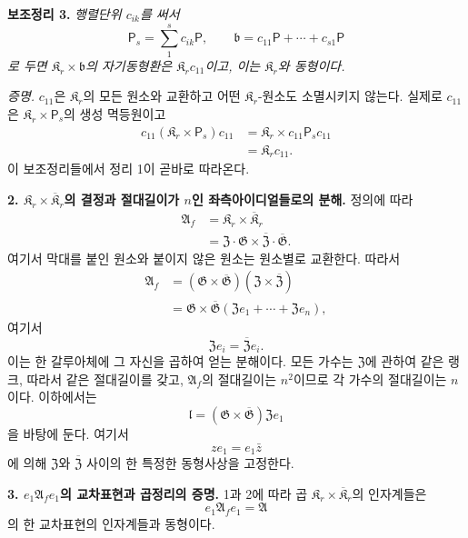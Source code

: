 \noindent\textbf{보조정리 3.} \emph{행렬단위 \(c_{ik}\)를 써서}
\[
        \mathsf P_s=\sum_1^s c_{ik}\mathsf P,
        \qquad
        \mathfrak b=c_{11}\mathsf P+
        \cdots+c_{s1}\mathsf P
\]
\emph{로 두면 \(\mathfrak K_r\times\mathfrak b\)의 자기동형환은 \(\mathfrak K_rc_{11}\)이고, 이는 \(\mathfrak K_r\)와 동형이다.}

\noindent\emph{증명.} \(c_{11}\)은 \(\mathfrak K_r\)의 모든 원소와 교환하고 어떤 \(\mathfrak K_r\)-원소도 소멸시키지 않는다. 실제로 \(c_{11}\)은 \(\mathfrak K_r\times\mathsf P_s\)의 생성 멱등원이고
\[
\begin{aligned}
c_{11}(\mathfrak K_r\times\mathsf P_s)c_{11}
 &=\mathfrak K_r\times c_{11}\mathsf P_sc_{11}\\
 &=\mathfrak K_rc_{11}.
\end{aligned}
\]
이 보조정리들에서 정리 1이 곧바로 따라온다.

\noindent\textbf{2. \(\mathfrak K_r\times\overline{\mathfrak K}_r\)의 결정과 절대길이가 \(n\)인 좌측아이디얼들로의 분해.} 정의에 따라
\[
\begin{aligned}
\mathfrak A_f
 &=\mathfrak K_r\times\overline{\mathfrak K}_r\\
 &=\mathfrak Z\mathbin{\cdot}\mathfrak G
   \times
   \overline{\mathfrak Z}\mathbin{\cdot}\overline{\mathfrak G}.
\end{aligned}
\]
여기서 막대를 붙인 원소와 붙이지 않은 원소는 원소별로 교환한다. 따라서
\[
\begin{aligned}
\mathfrak A_f
 &=(\mathfrak G\times\overline{\mathfrak G})
   (\mathfrak Z\times\overline{\mathfrak Z})\\
 &=\mathfrak G\times\overline{\mathfrak G}
   (\mathfrak Ze_1+\cdots+\mathfrak Ze_n),
\end{aligned}
\]
여기서
\[
        \mathfrak Ze_i=\overline{\mathfrak Z}e_i.
\]
이는 한 갈루아체에 그 자신을 곱하여 얻는 분해이다. 모든 가수는 \(\mathfrak Z\)에 관하여 같은 랭크, 따라서 같은 절대길이를 갖고, \(\mathfrak A_f\)의 절대길이는 \(n^2\)이므로 각 가수의 절대길이는 \(n\)이다. 이하에서는
\[
        \mathfrak l
        =(\mathfrak G\times\overline{\mathfrak G})
         \mathfrak Ze_1
\]
을 바탕에 둔다. 여기서
\[
        ze_1=e_1\bar z
\]
에 의해 \(\mathfrak Z\)와 \(\overline{\mathfrak Z}\) 사이의 한 특정한 동형사상을 고정한다.

\noindent\textbf{3. \(e_1\mathfrak A_fe_1\)의 교차표현과 곱정리의 증명.} 1과 2에 따라 곱 \(\mathfrak K_r\times\overline{\mathfrak K}_r\)의 인자계들은
\[
        e_1\mathfrak A_fe_1=\mathfrak A
\]
의 한 교차표현의 인자계들과 동형이다.

